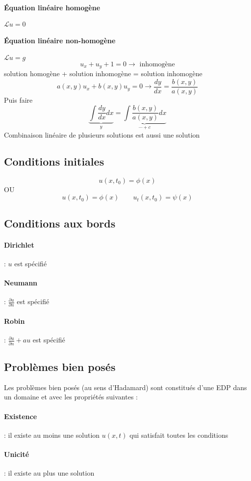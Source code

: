 \documentclass[resume]{subfiles}
\begin{document}
\paragraph{Équation linéaire homogène} $\mathcal{L}u=0$
\paragraph{Équation linéaire non-homogène} $\mathcal{L}u=g$
$$u_x+u_y+1=0\longrightarrow \text{ inhomogène}$$
solution homogène + solution inhomogène = solution inhomogène
$$\boxed{a(x,y)u_x+b(x,y)u_y=0\longrightarrow \frac{dy}{dx}=\frac{b(x,y)}{a(x,y)}}$$
Puis faire
$$\underbrace{\int \frac{dy}{dx}dx}_{y}=\underbrace{\int \frac{b(x,y)}{a(x,y)}dx}_{\cdots + c}$$
Combinaison linéaire de plusieurs solutions est aussi une solution
\subsection{Conditions initiales}
$$u(x,t_0)=\phi(x)$$
OU
$$u(x,t_0)=\phi(x)\qquad u_t(x,t_0)=\psi(x)$$
\subsection{Conditions aux bords}
\paragraph{Dirichlet} : $u$ est spécifié
\paragraph{Neumann} : $\frac{\partial u}{\partial n}$ est spécifié
\paragraph{Robin} : $\frac{\partial u}{\partial n}+au$ est spécifié
\subsection{Problèmes bien posés}
Les problèmes bien posés (au sens d'Hadamard) sont constitués d'une EDP dans un domaine et avec les propriétés suivantes :
\paragraph{Existence} : il existe au moins une solution $u(x,t)$ qui satisfait toutes les conditions
\paragraph{Unicité} : il existe au plus une solution
\end{document}
